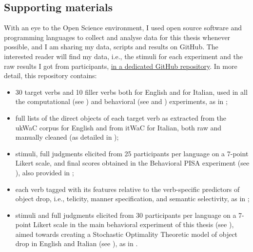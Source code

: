\subsection{Supporting materials} 
With an eye to the Open Science environment, I used open source software and programming languages to collect and analyse data for this thesis whenever possible, and I am sharing my data, scripts and results on GitHub. %
The interested reader will find my data, i.e., the stimuli for each experiment and the raw results I got from participants, \href{https://github.com/giuliacappelli/dissertationData}{in a dedicated GitHub repository}. In more detail, this repository contains:
\begin{itemize}
    \item 30 target verbs and 10 filler verbs both for English and for Italian, used in all the computational (see ) and behavioral (see  and ) experiments, as in ;
    \item full lists of the direct objects of each target verb as extracted from the ukWaC corpus for English and from itWaC for Italian, both raw and manually cleaned (as detailed in );
    \item stimuli, full judgments elicited from 25 participants per language on a 7-point Likert scale, and final scores obtained in the Behavioral PISA experiment (see ), also provided in ;
    \item each verb tagged with its features relative to the verb-specific predictors of object drop, i.e., telicity, manner specification, and semantic selectivity, as in ;
    \item stimuli and full judgments elicited from 30 participants per language on a 7-point Likert scale in the main behavioral experiment of this thesis (see ), aimed towards creating a Stochastic Optimality Theoretic model of object drop in English and Italian (see ), as in .
\end{itemize}
